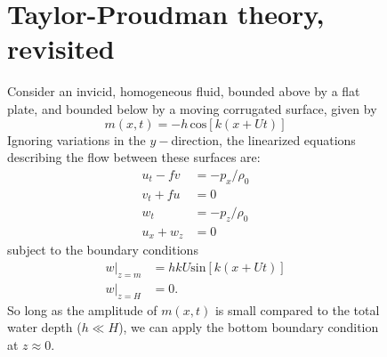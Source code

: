 \documentclass[11pt]{report}
\numberwithin{equation}{section}
\begin{document}
\begin{figure}
\section{Taylor-Proudman theory, revisited}
\label{prob:taylor-proudman}

Consider an invicid, homogeneous fluid, bounded above by a flat plate, and
bounded below by a moving corrugated surface, given by 
\[m(x,t) = -h\,\mathrm{cos}[k(x+Ut)]\]
Ignoring variations in the $y-$direction, the linearized equations
describing the flow between these surfaces are:
\begin{align}
  u_t - f v &= - p_x/\rho_0 \label{u.moment}\\
  v_t + f u &= 0 \label{v.moment}\\
  w_t &= -p_z/\rho_0 \label{z.moment}\\
  u_x + w_z &= 0 \label{cont}
\end{align}
subject to the boundary conditions
\begin{align}
  w\bigr|_{z=m} &= h k U \mathrm{sin}[k (x + U t)] \\
  w\bigr|_{z=H} &= 0.
\end{align}
So long as the amplitude of $m(x,t)$ is small compared to the total water
depth ($h \ll H$), we can apply the bottom boundary condition at
$z\approx0$.


\end{figure}
\end{document}
